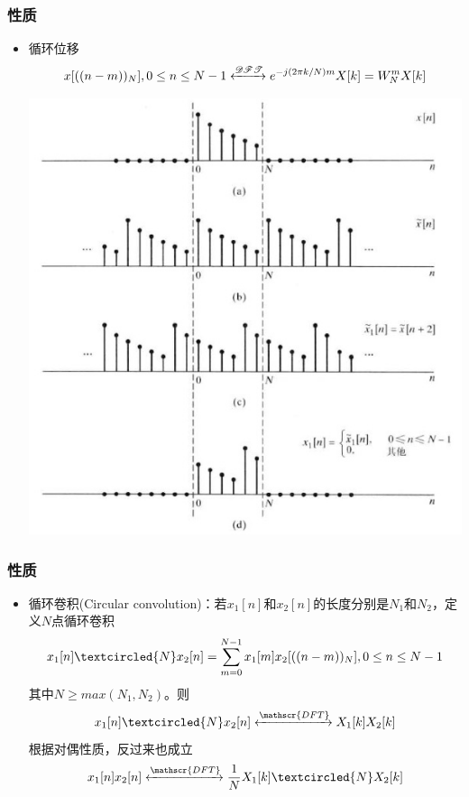 \documentclass[CJKutf8,xcolor=pdftex,dvipsnames,table]{beamer}
\begin{document}
\begin{CJK*}{UTF8}{song}
  \begin{frame}
    \frametitle{性质}
    \begin{itemize}
    \item 循环位移
    \[
    	x[((n-m))_N], 0 \leq n \leq N-1 \xleftrightarrow{\mathscr{DFT}} e^{-j(2\pi k/N)m}X[k]=W_N^m X[k]
    \]
        \begin{center}
      \includegraphics[scale=.35]{dtsp-c-f8-12}
    \end{center}
	\end{itemize}
  \end{frame}        
      
  \begin{frame}
    \frametitle{性质}
    \begin{itemize}
    \item 循环卷积(Circular convolution)：若$x_1[n]$和$x_2[n]$的长度分别是$N_1$和$N_2$，定义$N$点循环卷积
    \[
    	x_1[n] \textcircled{N} x_2[n]=\sum_{m=0}^{N-1}x_1[m]x_2[((n-m))_N], 0 \leq n \leq N-1
    \]
    其中$N\geq max(N_1, N_2)$。则
    \[
		x_1[n] \textcircled{N} x_2[n] \xleftrightarrow{\mathscr{DFT}} X_1[k]X_2[k]
	\]    
	根据对偶性质，反过来也成立
	\[
		x_1[n]x_2[n] \xleftrightarrow{\mathscr{DFT}} \frac{1}{N} X_1[k] \textcircled{N} X_2[k]
	\] 
	\end{itemize}
  \end{frame}         
      

\end{CJK*}
\end{document}

